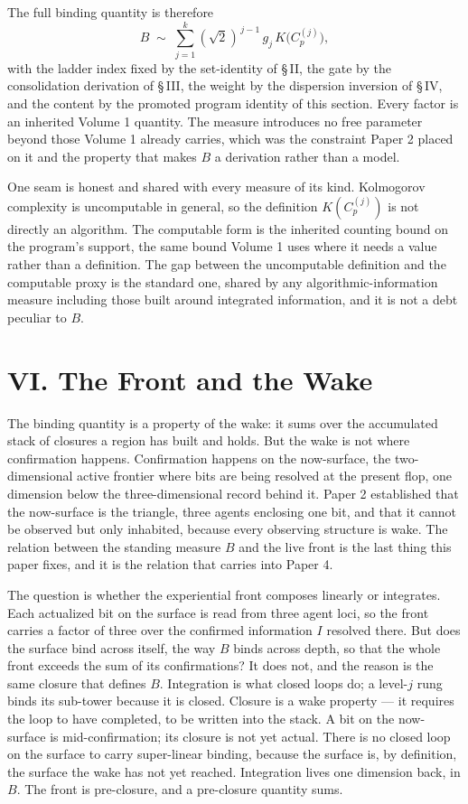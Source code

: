 \documentclass[11pt,oneside]{report}
\theoremstyle{definition}
\theoremstyle{remark}
\begin{document}
The full binding quantity is therefore
\[
B \;\sim\; \sum_{j=1}^{k} (\sqrt{2})^{\,j-1}\,g_{j}\,K\bigl(C_{p}^{(j)}\bigr),
\]
with the ladder index fixed by the set-identity of \S\,II, the gate by the
consolidation derivation of \S\,III, the weight by the dispersion inversion of
\S\,IV, and the content by the promoted program identity of this section.
Every factor is an inherited Volume 1 quantity. The measure introduces no free
parameter beyond those Volume 1 already carries, which was the constraint Paper
2 placed on it and the property that makes \ensuremath{B} a derivation rather
than a model.

One seam is honest and shared with every measure of its kind. Kolmogorov
complexity is uncomputable in general, so the definition \ensuremath{K(C_{p}^{(j)})}
is not directly an algorithm. The computable form is the inherited counting
bound on the program's support, the same bound Volume 1 uses where it needs a
value rather than a definition. The gap between the uncomputable definition and
the computable proxy is the standard one, shared by any algorithmic-information
measure including those built around integrated information, and it is not a
debt peculiar to \ensuremath{B}.

\section*{VI. The Front and the Wake}

The binding quantity is a property of the wake: it sums over the accumulated stack of closures a region has built and holds. But the wake is not
where confirmation happens. Confirmation happens on the now-surface, the
two-dimensional active frontier where bits are being resolved at the present
flop, one dimension below the three-dimensional record behind it. Paper 2
established that the now-surface is the triangle, three agents enclosing one
bit, and that it cannot be observed but only inhabited, because every observing
structure is wake. The relation between the standing measure \ensuremath{B} and
the live front is the last thing this paper fixes, and it is the relation that
carries into Paper 4.

The question is whether the experiential front composes linearly or integrates.
Each actualized bit on the surface is read from three agent loci, so the front
carries a factor of three over the confirmed information \ensuremath{I} resolved
there. But does the surface bind across itself, the way \ensuremath{B} binds
across depth, so that the whole front exceeds the sum of its confirmations? It
does not, and the reason is the same closure that defines \ensuremath{B}.
Integration is what closed loops do; a level-\ensuremath{j} rung binds its
sub-tower because it is closed. Closure is a wake property --- it requires the
loop to have completed, to be written into the stack. A bit on the now-surface
is mid-confirmation; its closure is not yet actual. There is no closed loop on
the surface to carry super-linear binding, because the surface is, by
definition, the surface the wake has not yet reached. Integration lives one
dimension back, in \ensuremath{B}. The front is pre-closure, and a pre-closure
quantity sums.
\end{document}
